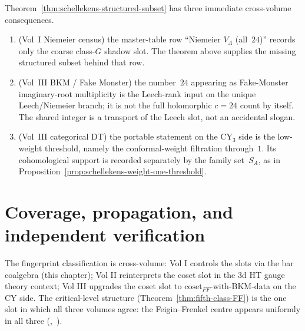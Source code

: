 \begin{remark}
\label{rem:schellekens-structured-cross-volume}
Theorem~\ref{thm:schellekens-structured-subset} has three immediate
cross-volume consequences.
\begin{enumerate}[label=\textup{(\arabic*)},leftmargin=*]
\item \textup{(}Vol~I Niemeier census\textup{)}
 the master-table row ``Niemeier $V_\Lambda$ (all~$24$)'' records only
 the coarse class-$G$ shadow slot. The theorem above supplies the
 missing structured subset behind that row.
\item \textup{(}Vol~III BKM / Fake Monster\textup{)}
 the number~$24$ appearing as Fake-Monster imaginary-root multiplicity
 is the Leech-rank input on the unique Leech/Niemeier branch; it is not
 the full holomorphic $c=24$ count by itself. The shared integer is a
 transport of the Leech slot, not an accidental slogan.
\item \textup{(}Vol~III categorical DT\textup{)}
 the portable statement on the CY$_3$ side is the low-weight threshold,
 namely the conformal-weight filtration through~$1$. Its
 cohomological support is recorded separately by the family set~$S_A$,
 as in Proposition~\ref{prop:schellekens-weight-one-threshold}.
\end{enumerate}
\end{remark}

\section{Coverage, propagation, and independent verification}
\label{sec:coverage-propagation}

The fingerprint classification is cross-volume: Vol I controls the
slots via the bar coalgebra (this chapter); Vol II reinterprets
the coset slot in the 3d HT gauge theory context; Vol III upgrades
the coset slot to $\mathrm{coset}_{FF}$-with-BKM-data on the CY
side. The critical-level structure (Theorem~\ref{thm:fifth-class-FF})
is the one slot in which all three volumes agree: the Feigin--Frenkel
centre appears uniformly in all three
\textup{(}\cite{FeiginFrenkel1992},~\cite{ArakawaFrenkel2017}\textup{)}.

